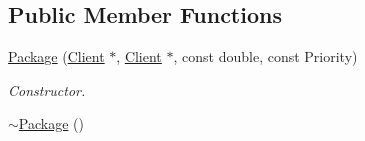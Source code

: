 \subsection*{Public Member Functions}
\begin{DoxyCompactItemize}
\item 
\hyperlink{classPackage_a64d987fe7cb1d583f2af4a38e544a6f2}{Package} (\hyperlink{classClient}{Client} $\ast$, \hyperlink{classClient}{Client} $\ast$, const double, const Priority)
\begin{DoxyCompactList}\small\item\em Constructor. \end{DoxyCompactList}\item 
\hyperlink{classPackage_af9b48c577bb6045c2cbc97d09f76e973}{$\sim$\+Package} ()\hypertarget{classPackage_af9b48c577bb6045c2cbc97d09f76e973}{}\label{classPackage_af9b48c577bb6045c2cbc97d09f76e973}


\end{DoxyCompactItemize}
